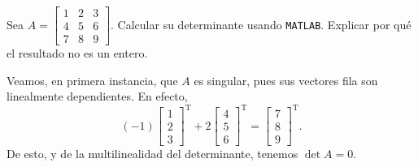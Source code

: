 \begin{problema}
    Sea \(A=\begin{bmatrix}1 & 2 & 3\\ 4 & 5 & 6\\ 7 & 8 & 9\end{bmatrix}.\) Calcular su determinante usando \texttt{MATLAB}. Explicar por qu\'e el resultado no es un entero.
\end{problema}

Veamos, en primera instancia, que \(A\) es singular, pues sus vectores fila son linealmente dependientes. En efecto,
\begin{equation}
    (-1) \begin{bmatrix}1\\ 2\\ 3\end{bmatrix}^\mathrm{T } + 2 \begin{bmatrix}4\\ 5\\ 6\end{bmatrix}^\mathrm{T } = \begin{bmatrix}7\\ 8\\ 9\end{bmatrix}^\mathrm{T }.
\end{equation}
De esto, y de la multilinealidad del determinante, tenemos \(\det A =0\).

